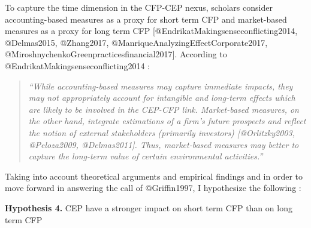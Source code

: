 \documentclass[]{article}
\begin{document}
To capture the time dimension in the CFP-CEP nexus, scholars consider
accounting-based measures as a proxy for short term CFP and market-based
measures as a proxy for long term CFP
{[}@EndrikatMakingsenseconflicting2014, @Delmas2015, @Zhang2017,
@ManriqueAnalyzingEffectCorporate2017,
@MiroshnychenkoGreenpracticesfinancial2017{]}. According to
@EndrikatMakingsenseconflicting2014 :

\begin{quote}
\emph{``While accounting-based measures may capture immediate impacts,
they may not appropriately account for intangible and long-term effects
which are likely to be involved in the CEP-CFP link. Market-based
measures, on the other hand, integrate estimations of a firm's future
prospects and reflect the notion of external stakeholders (primarily
investors) {[}@Orlitzky2003, @Peloza2009, @Delmas2011{]}. Thus,
market-based measures may better to capture the long-term value of
certain environmental activities.''}
\end{quote}

Taking into account theoretical arguments and empirical findings and in
order to move forward in answering the call of @Griffin1997, I
hypothesize the following :

\textbf{Hypothesis 4.} CEP have a stronger impact on short term CFP than
on long term CFP
\end{document}
